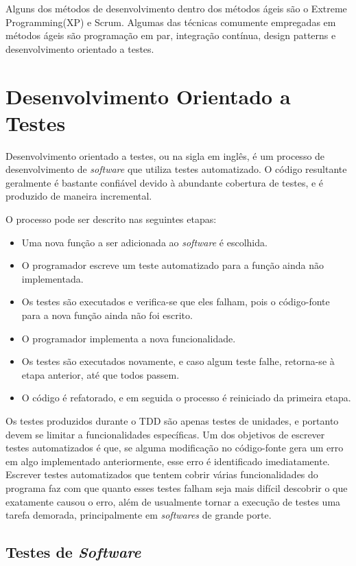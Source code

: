 Alguns dos métodos de desenvolvimento dentro dos métodos ágeis são o Extreme Programming(XP) e Scrum. Algumas das técnicas comumente empregadas em métodos ágeis são programação em par, integração contínua, design patterns e desenvolvimento orientado a testes.

\section{Desenvolvimento Orientado a Testes}\label{fun:tdd}

Desenvolvimento orientado a testes, ou  na sigla em inglês, é um processo de desenvolvimento de \emph{software} que utiliza testes automatizado. O código resultante geralmente é bastante confiável devido à abundante cobertura de testes, e é produzido de maneira incremental.

O processo pode ser descrito nas seguintes etapas:
\begin{itemize}
\item Uma nova função a ser adicionada ao \emph{software} é escolhida.
\item O programador escreve um teste automatizado para a função ainda não implementada.
\item Os testes são executados e verifica-se que eles falham, pois o código-fonte para a nova função ainda não foi escrito.
\item O programador implementa a nova funcionalidade.
\item Os testes são executados novamente, e caso algum teste falhe, retorna-se à etapa anterior, até que todos passem.
\item O código é refatorado, e em seguida o processo é reiniciado da primeira etapa.
\end{itemize}

Os testes produzidos durante o TDD são apenas testes de unidades, e portanto devem se limitar a funcionalidades específicas. Um dos objetivos de escrever testes automatizados é que, se alguma modificação no código-fonte gera um erro em algo implementado anteriormente, esse erro é identificado imediatamente. Escrever testes automatizados que tentem cobrir várias funcionalidades do programa faz com que quanto esses testes falham seja mais difícil descobrir o que exatamente causou o erro, além de usualmente tornar a execução de testes uma tarefa demorada, principalmente em \emph{softwares} de grande porte.

\subsection{Testes de \emph{Software}}

